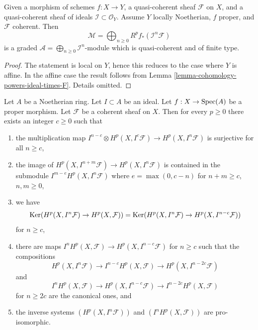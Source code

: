 \begin{lemma}
\label{lemma-cohomology-powers-ideal-times-sheaf}
Given a morphism of schemes $f : X \to Y$, a quasi-coherent sheaf
$\mathcal{F}$ on $X$, and a quasi-coherent sheaf of ideals
$\mathcal{I} \subset \mathcal{O}_Y$. Assume $Y$ locally
Noetherian, $f$ proper, and $\mathcal{F}$ coherent.
Then
$$
\mathcal{M} =
\bigoplus\nolimits_{n \geq 0} R^pf_*(\mathcal{I}^n\mathcal{F})
$$
is a graded $\mathcal{A} = \bigoplus_{n \geq 0} \mathcal{I}^n$-module
which is quasi-coherent and of finite type.
\end{lemma}

\begin{proof}
The statement is local on $Y$, hence this reduces to the
case where $Y$ is affine. In the affine case the result follows
from Lemma \ref{lemma-cohomology-powers-ideal-times-F}.
Details omitted.
\end{proof}

\begin{lemma}
\label{lemma-cohomology-powers-ideal-application}
Let $A$ be a Noetherian ring.
Let $I \subset A$ be an ideal.
Let $f : X \to \mathop{\mathrm{Spec}}(A)$ be a proper morphism.
Let $\mathcal{F}$ be a coherent sheaf on $X$.
Then for every $p \geq 0$ there exists an integer $c \geq 0$
such that
\begin{enumerate}
\item the multiplication map
$I^{n - c} \otimes H^p(X, I^c\mathcal{F}) \to H^p(X, I^n\mathcal{F})$
is surjective for all $n \geq c$,
\item the image of $H^p(X, I^{n + m}\mathcal{F}) \to H^p(X, I^n\mathcal{F})$
is contained in the submodule $I^{m - e} H^p(X, I^n\mathcal{F})$
where $e = \max(0, c - n)$ for $n + m \geq c$, $n, m \geq 0$,
\item we have
$$
\mathop{\mathrm{Ker}}(H^p(X, I^n\mathcal{F}) \to H^p(X, \mathcal{F})) =
\mathop{\mathrm{Ker}}(H^p(X, I^n\mathcal{F}) \to H^p(X, I^{n - c}\mathcal{F}))
$$
for $n \geq c$,
\item there are maps $I^nH^p(X, \mathcal{F}) \to H^p(X, I^{n - c}\mathcal{F})$
for $n \geq c$ such that the compositions
$$
H^p(X, I^n\mathcal{F}) \to 
I^{n - c}H^p(X, \mathcal{F}) \to
H^p(X, I^{n - 2c}\mathcal{F})
$$
and
$$
I^nH^p(X, \mathcal{F}) \to
H^p(X, I^{n - c}\mathcal{F}) \to
I^{n - 2c}H^p(X, \mathcal{F})
$$
for $n \geq 2c$ are the canonical ones, and
\item the inverse systems $(H^p(X, I^n\mathcal{F}))$ and
$(I^nH^p(X, \mathcal{F}))$ are pro-isomorphic.
\end{enumerate}
\end{lemma}

